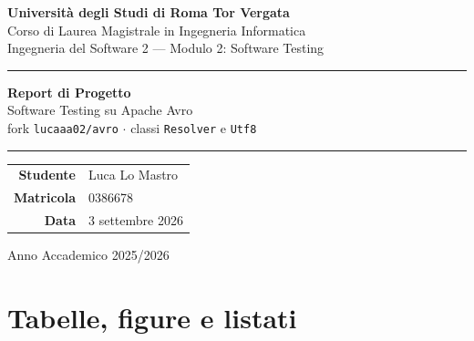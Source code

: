 \documentclass[10pt,a4paper]{article}
\begin{document}
\begin{titlepage}
\centering
\vspace*{2cm}

{\Large\textbf{Università degli Studi di Roma Tor Vergata}}\\[0.3cm]
{\large Corso di Laurea Magistrale in Ingegneria Informatica}\\[0.3cm]
{\normalsize Ingegneria del Software 2 — Modulo 2: Software Testing}

\vspace{1.5cm}
\noindent\rule{\textwidth}{0.8pt}
\vspace{0.4cm}

{\LARGE\textbf{Report di Progetto}}\\[0.5cm]
{\large Software Testing su Apache Avro}\\[0.2cm]
{\normalsize fork \texttt{lucaaa02/avro} $\cdot$ classi \texttt{Resolver} e \texttt{Utf8}}

\vspace{0.4cm}
\noindent\rule{\textwidth}{0.8pt}

\vspace{2cm}

\begin{tabular}{rl}
\textbf{Studente}  & Luca Lo Mastro \\
\textbf{Matricola} & 0386678 \\
\textbf{Data}      & 3 settembre 2026 \\
\end{tabular}

\vfill

{\small Anno Accademico 2025/2026}

\end{titlepage}

\tableofcontents
\newpage
{} 
\setcounter{page}{1}









\clearpage
{}  
\setcounter{page}{1}
\appendix
\section{Tabelle, figure e listati}

\end{document}
